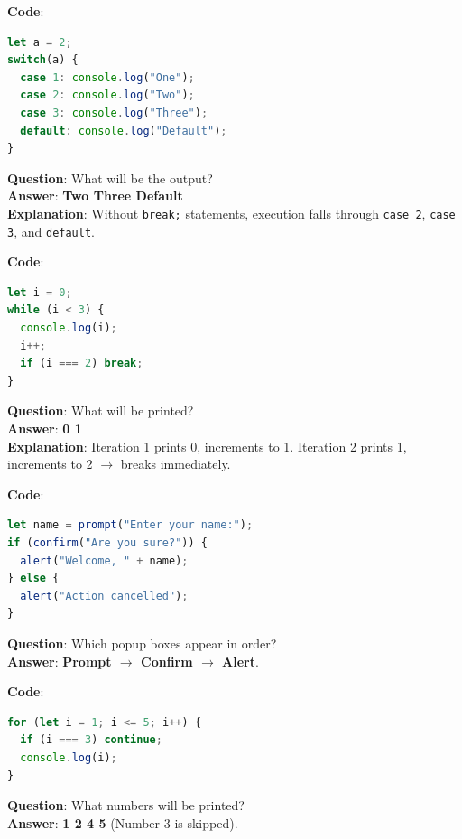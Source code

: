 \begin{quizbox}
\textbf{Code}:
\begin{lstlisting}[language=JavaScript]
let a = 2;
switch(a) {
  case 1: console.log("One");
  case 2: console.log("Two");
  case 3: console.log("Three");
  default: console.log("Default");
}
\end{lstlisting}
\textbf{Question}: What will be the output?\\
\textbf{Answer}: \textbf{Two Three Default}\\
\textbf{Explanation}: Without \texttt{break;} statements, execution falls through \texttt{case 2}, \texttt{case 3}, and \texttt{default}.
\end{quizbox}

\begin{quizbox}
\textbf{Code}:
\begin{lstlisting}[language=JavaScript]
let i = 0;
while (i < 3) {
  console.log(i);
  i++;
  if (i === 2) break;
}
\end{lstlisting}
\textbf{Question}: What will be printed?\\
\textbf{Answer}: \textbf{0 1}\\
\textbf{Explanation}: Iteration 1 prints 0, increments to 1. Iteration 2 prints 1, increments to 2 $\to$ breaks immediately.
\end{quizbox}

\begin{quizbox}
\textbf{Code}:
\begin{lstlisting}[language=JavaScript]
let name = prompt("Enter your name:");
if (confirm("Are you sure?")) {
  alert("Welcome, " + name);
} else {
  alert("Action cancelled");
}
\end{lstlisting}
\textbf{Question}: Which popup boxes appear in order?\\
\textbf{Answer}: \textbf{Prompt $\to$ Confirm $\to$ Alert}.
\end{quizbox}

\begin{quizbox}
\textbf{Code}:
\begin{lstlisting}[language=JavaScript]
for (let i = 1; i <= 5; i++) {
  if (i === 3) continue;
  console.log(i);
}
\end{lstlisting}
\textbf{Question}: What numbers will be printed?\\
\textbf{Answer}: \textbf{1 2 4 5} (Number 3 is skipped).
\end{quizbox}

